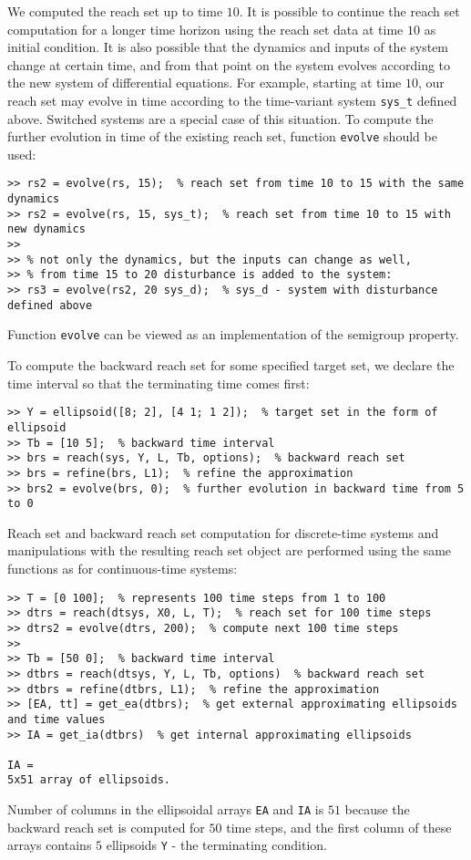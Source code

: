 We computed the reach set up to time $10$. It is possible to continue
the reach set computation for a longer time horizon using the reach set
data at time $10$ as initial condition.
It is also possible that the dynamics and inputs of the system change at
certain time, and from that point on the system evolves according to the new
system of differential equations. For example, starting at time $10$, our
reach set may evolve in time according to the time-variant system {\tt sys\_t}
defined above. Switched systems are a special case of this situation.
To compute the further evolution in time of the existing reach set,
function {\tt evolve} should be used:
{\tt \begin{verbatim}
>> rs2 = evolve(rs, 15);  % reach set from time 10 to 15 with the same dynamics
>> rs2 = evolve(rs, 15, sys_t);  % reach set from time 10 to 15 with new dynamics
>>
>> % not only the dynamics, but the inputs can change as well,
>> % from time 15 to 20 disturbance is added to the system:
>> rs3 = evolve(rs2, 20 sys_d);  % sys_d - system with disturbance defined above
\end{verbatim} }
Function {\tt evolve} can be viewed as an implementation of the semigroup
property.

To compute the backward reach set for some specified target set,
we declare the time interval so that the terminating time comes first:
{\tt \begin{verbatim}
>> Y = ellipsoid([8; 2], [4 1; 1 2]);  % target set in the form of ellipsoid
>> Tb = [10 5];  % backward time interval
>> brs = reach(sys, Y, L, Tb, options);  % backward reach set
>> brs = refine(brs, L1);  % refine the approximation
>> brs2 = evolve(brs, 0);  % further evolution in backward time from 5 to 0
\end{verbatim} }
Reach set and backward reach set computation for discrete-time systems and
manipulations with the resulting reach set object are performed using
the same functions as for continuous-time systems:
{\tt \begin{verbatim}
>> T = [0 100];  % represents 100 time steps from 1 to 100
>> dtrs = reach(dtsys, X0, L, T);  % reach set for 100 time steps
>> dtrs2 = evolve(dtrs, 200);  % compute next 100 time steps
>>
>> Tb = [50 0];  % backward time interval
>> dtbrs = reach(dtsys, Y, L, Tb, options)  % backward reach set
>> dtbrs = refine(dtbrs, L1);  % refine the approximation
>> [EA, tt] = get_ea(dtbrs);  % get external approximating ellipsoids and time values
>> IA = get_ia(dtbrs)  % get internal approximating ellipsoids

IA =
5x51 array of ellipsoids.
\end{verbatim} }
Number of columns in the ellipsoidal arrays {\tt EA} and {\tt IA} is $51$
because the backward reach set is computed for $50$ time steps, and the first
column of these arrays contains $5$ ellipsoids {\tt Y} - the terminating
condition.

